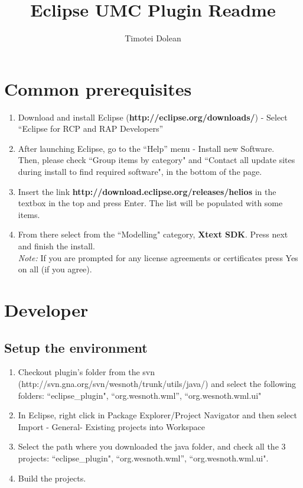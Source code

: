 \documentclass[10pt]{article}
\title{Eclipse UMC Plugin Readme}
\author{Timotei Dolean}
\begin{document}
\maketitle

\newcommand{\icnt}{ \stepcounter{cnt} \thecnt }

\section{Common prerequisites}
\begin{enumerate}
\item Download and install Eclipse (\textbf{http://eclipse.org/downloads/}) - Select ``Eclipse for RCP and RAP Developers''
\item After launching Eclipse, go to the ``Help'' menu - Install new Software. \\
  Then, please check ``Group items by category" and ``Contact all update sites during install to find required software",
  in the bottom of the page.
\item Insert the link \textbf{http://download.eclipse.org/releases/helios} in the textbox in the top and press Enter.
  The list will be populated with some items.
\item From there select from the ``Modelling" category, \textbf{Xtext SDK}.
  Press next and finish the install.\\
  \textit{Note:} If you are prompted for any license agreements or certificates press Yes on all (if you agree).
\end{enumerate}

\section{Developer}
\subsection{Setup the environment}
\begin{enumerate}
\item Checkout plugin's folder from the svn (http://svn.gna.org/svn/wesnoth/trunk/utils/java/) and select the following folders: ``eclipse\_plugin", ``org.wesnoth.wml'', ``org.wesnoth.wml.ui"
\item In Eclipse, right click in Package Explorer/Project Navigator and then select
  Import - General- Existing projects into Workspace
\item Select the path where you downloaded the java folder, and check all the 3 projects: ``eclipse\_plugin", ``org.wesnoth.wml'', ``org.wesnoth.wml.ui".
\item Build the projects.
\end{enumerate}
\end{document}
